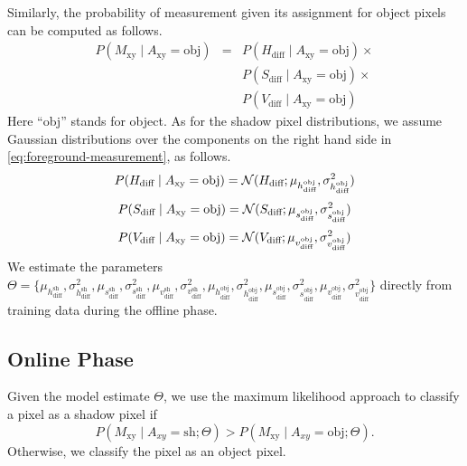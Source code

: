 Similarly, the probability of measurement given its assignment for 
object pixels can be computed as follows.
\begin{equation}
  \label{eq:foreground-measurement}
  \begin{array}{ccl}
    P(M_{\text{xy}} \mid A_{\text{xy}} = \text{obj}) 
            & = & P(H_{\text{diff}} \mid A_{\text{xy}} = \text{obj}) \times \\
            &   & P(S_{\text{diff}} \mid A_{\text{xy}} = \text{obj}) \times \\
            &   & P(V_{\text{diff}} \mid A_{\text{xy}} = \text{obj})
  \end{array}
\end{equation}
Here ``obj'' stands for object. As for the shadow pixel distributions,
we assume Gaussian distributions over the components on the right hand
side in \ref{eq:foreground-measurement}, as follows.
\begin{equation*}
  P(H_{\text{diff}} \mid A_{\text{xy}} = \text{obj}) =
  {\cal N}(H_{\text{diff}} ;
  \mu_{h_{\text{diff}}^{\text{obj}}},
  \sigma^2_{h_{\text{diff}}^{\text{obj}}})
\end{equation*}
\begin{equation*}
  P(S_{\text{diff}} \mid A_{\text{xy}} = \text{obj}) =
  {\cal N}(S_{\text{diff}} ;
  \mu_{s_{\text{diff}}^{\text{obj}}},
  \sigma^2_{s_{\text{diff}}^{\text{obj}}})
\end{equation*}
\begin{equation*}
  P(V_{\text{diff}} \mid A_{\text{xy}} = \text{obj}) =
  {\cal N}(V_{\text{diff}} ;
  \mu_{v_{\text{diff}}^{\text{obj}}},
  \sigma^2_{v_{\text{diff}}^{\text{obj}}})
\end{equation*}
We estimate the parameters $\Theta = \{
\mu_{h_{\text{diff}}^{\text{sh}}},
\sigma^2_{h_{\text{diff}}^{\text{sh}}},
\mu_{s_{\text{diff}}^{\text{sh}}},
\sigma^2_{s_{\text{diff}}^{\text{sh}}},
\mu_{v_{\text{diff}}^{\text{sh}}},
\sigma^2_{v_{\text{diff}}^{\text{sh}}},
\mu_{h_{\text{diff}}^{\text{obj}}},
\sigma^2_{h_{\text{diff}}^{\text{obj}}},
\mu_{s_{\text{diff}}^{\text{obj}}},
\sigma^2_{s_{\text{diff}}^{\text{obj}}},
\mu_{v_{\text{diff}}^{\text{obj}}},
\sigma^2_{v_{\text{diff}}^{\text{obj}}} \}$ directly from training
data during the offline phase.

\subsection{Online Phase}

Given the model estimate $\Theta$, we use the maximum likelihood
approach to classify a pixel as a shadow pixel if
\begin{equation}
  \label{eq:ml}
  P(M_{\text{xy}} \mid A_{xy}=\text{sh} ; \Theta ) >
  P(M_{\text{xy}} \mid A_{xy}=\text{obj} ; \Theta ).
\end{equation}
Otherwise, we classify the pixel as an object pixel.

